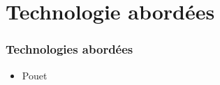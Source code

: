 \section{Technologie abordées}
  \begin{frame}
    \frametitle{Technologies abordées}
    \begin{itemize}
      \item Pouet
    \end{itemize}
  \end{frame}

